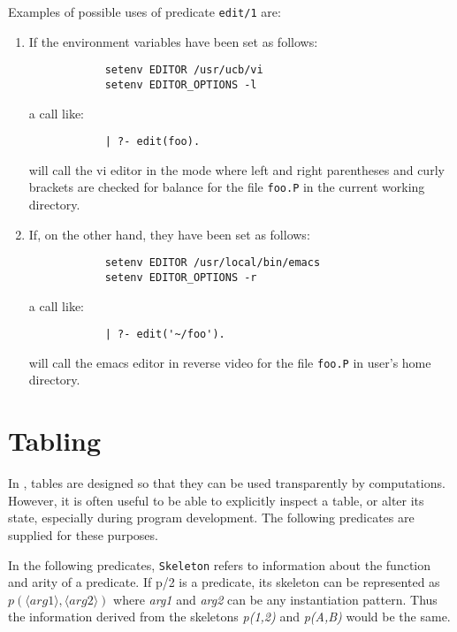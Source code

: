 \begin{description}
    Examples of possible uses of predicate {\tt edit/1} are:
    \begin{enumerate}
    \item If the environment variables have been set as follows:
          \begin{verbatim}
	        setenv EDITOR /usr/ucb/vi
	        setenv EDITOR_OPTIONS -l
          \end{verbatim}
          a call like:
          \begin{verbatim}
	        | ?- edit(foo).
          \end{verbatim}
          will call the vi editor in the mode where left and right parentheses
	  and curly brackets are checked for balance for the file {\tt foo.P}
	  in the current working directory.
    \item If, on the other hand, they have been set as follows:
          \begin{verbatim}
	        setenv EDITOR /usr/local/bin/emacs
	        setenv EDITOR_OPTIONS -r
          \end{verbatim}
          a call like:
          \begin{verbatim}
	        | ?- edit('~/foo').
          \end{verbatim}
          will call the emacs editor in reverse video for the file {\tt foo.P}
	  in user's home directory.
    \end{enumerate}

\end{description}



\section{Tabling}\label{tabling_predicates}

In \ourprolog, tables are designed so that they can be used
transparently by computations.  However, it is often useful to be able
to explicitly inspect a table, or alter its state, especially during
program development.  The following predicates are supplied for these
purposes.

In the following predicates, {\tt Skeleton} refers to information
about the function and arity of a predicate.  If p/2 is a predicate,
its skeleton can be represented as {$p(\langle arg1 \rangle,\langle
arg2 \rangle)$} where {\em arg1} and {\em arg2} can be any
instantiation pattern.  Thus the information derived from the
skeletons {\em p(1,2)} and {\em p(A,B)} would be the same.

